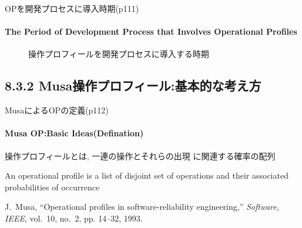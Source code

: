 \begin{frame}{OPを開発プロセスに導入時期(p111)}
\framesubtitle{The Period of Development Process that Involves Operational Profiles}
\begin{figure}
\begin{center}
\begin{overprint}
 \begin{center}\end{center}
 \begin{center}\end{center}
 \begin{center}\end{center}
\end{overprint}
\caption{操作プロフィールを開発プロセスに導入する時期}
\end{center}
\end{figure}
\end{frame}
\subsection{8.3.2 Musa操作プロフィール:基本的な考え方}
\begin{frame}[shrink=10]{MusaによるOPの定義(p112)}
\framesubtitle{Musa OP:Basic Ideas(Defination)}
\begin{definationfc}[操作プロフィール]
操作プロフィールとは, 一連の操作とそれらの出現
に関連する確率の配列 

An operational profile is a list of disjoint set of operations
and their associated probabilities of occurrence

\end{definationfc}

\begin{thebibliography}{Musa(1993)}

J.~Musa, ``Operational profiles in software-reliability engineering,''
  \emph{Software, IEEE}, vol.~10, no.~2, pp. 14--32, 1993.

\end{thebibliography}


\end{frame}

